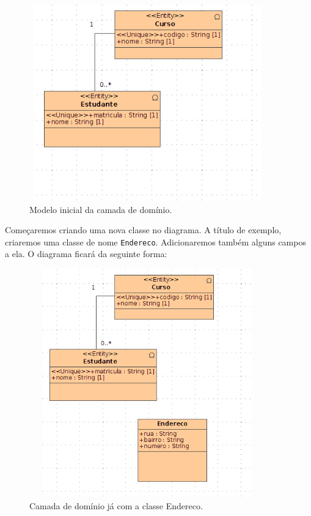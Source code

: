 \begin{figure}[H]
	\centering
	\includegraphics[width=290pt,height=240pt]{files/imgs/tutorial-mdarte-jsonb-0004.png}
	\caption{Modelo inicial da camada de domínio.}
	\label{camada_dominio}
\end{figure}

Começaremos criando uma nova classe no diagrama. A título de exemplo, criaremos
uma classe de nome \texttt{Endereco}. Adicionaremos também alguns campos a ela.
O diagrama ficará da seguinte forma:

\begin{figure}[H]
	\centering
	\includegraphics[width=290pt,height=280pt]{files/imgs/tutorial-mdarte-jsonb-0003.png}
	\caption{Camada de domínio já com a classe Endereco.}
	\label{camada_dominio_endereco}
\end{figure}

